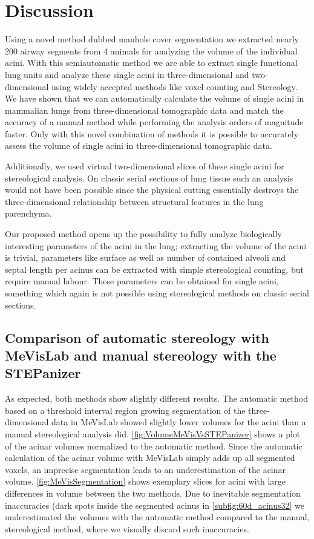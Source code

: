 \documentclass[%
	paper=a4,%
	abstract=true,%
	]{scrartcl}
\begin{document}
\section{Discussion}
Using a novel method dubbed manhole cover segmentation we extracted nearly 200 airway segments from 4 animals for analyzing the volume of the individual acini. With this semiautomatic method we are able to extract single functional lung units and analyze these single acini in three-dimensional and two-dimensional using widely accepted methods like voxel counting and Stereology. We have shown that we can automatically calculate the volume of single acini in mammalian lungs from three-dimensional tomographic data and match the accuracy of a manual method while performing the analysis orders of magnitude faster. Only with this novel combination of methods it is possible to accurately assess the volume of single acini in three-dimensional tomographic data.

Additionally, we used virtual two-dimensional slices of these single acini for stereological analysis. On classic serial sections of lung tissue such an analysis would not have been possible since the physical cutting essentially destroys the three-dimensional relationship between structural features in the lung parenchyma.

Our proposed method opens up the possibility to fully analyze biologically interesting parameters of the acini in the lung; extracting the volume of the acini is trivial, parameters like surface as well as number of contained alveoli and septal length per acinus can be extracted with simple stereological counting, but require manual labour. These parameters can be obtained for single acini, something which again is not possible using stereological methods on classic serial sections.

\subsection[Comparison of MeVisLab with STEPanizer]{Comparison of automatic stereology with MeVisLab and manual stereology with the STEPanizer}
As expected, both methods show slightly different results. The automatic method based on a threshold interval region growing segmentation of the three-dimensional data in MeVisLab showed slightly lower volumes for the acini than a manual stereological analysis did. \autoref{fig:VolumeMeVisVsSTEPanizer} shows a plot of the acinar volumes normalized to the automatic method. Since the automatic calculation of the acinar volume with MeVisLab simply adds up all segmented voxels, an imprecise segmentation leads to an underestimation of the acinar volume. \autoref{fig:MeVisSegmentation} shows exemplary slices for acini with large differences in volume between the two methods. Due to inevitable segmentation inaccuracies (dark spots inside the segmented acinus in \autoref{subfig:60d_acinus32} we underestimated the volumes with the automatic method compared to the manual, stereological method, where we visually discard such inaccuracies.
\end{document}
